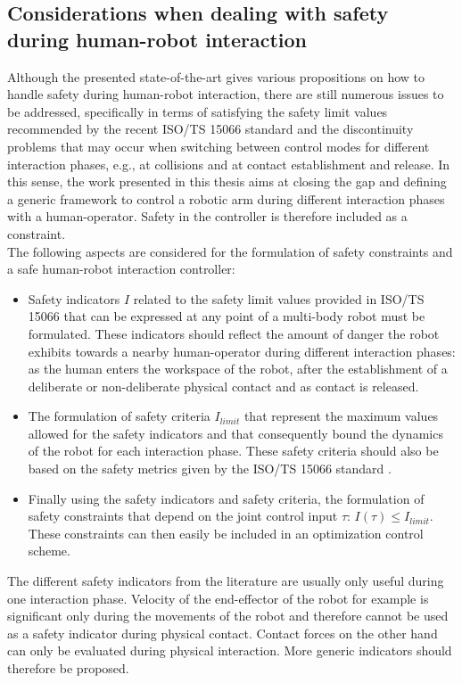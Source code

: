 \subsection{Considerations when dealing with safety during human-robot interaction}
Although the presented state-of-the-art gives various propositions on how to handle safety during human-robot interaction, there are still numerous issues to be addressed, specifically in terms of satisfying the safety limit values recommended by the recent ISO/TS 15066 standard \cite{ISO15066PDF} and the discontinuity problems that may occur when switching between control modes for different interaction phases, e.g., at collisions and at contact establishment and release. In this sense, the work presented in this thesis aims at closing the gap and defining a generic framework to control a robotic arm during different interaction phases with a human-operator. Safety in the controller is therefore included as a constraint.\\
The following aspects are considered for the formulation of safety constraints and a safe human-robot interaction controller: 
\begin{itemize}
\item Safety indicators $I$ related to the safety limit values provided in ISO/TS 15066 \cite{ISO15066PDF} that can be expressed at any point of a multi-body robot must be formulated. These indicators should reflect the amount of danger the robot exhibits towards a nearby human-operator during different interaction phases: as the human enters the workspace of the robot, after the establishment of a deliberate or non-deliberate physical contact and as contact is released.
\item The formulation of safety criteria $I_{limit}$ that represent the maximum values allowed for the safety indicators and that consequently bound the dynamics of the robot for each interaction phase. These safety criteria should also be based on the safety metrics given by the ISO/TS 15066 standard \cite{ISO15066PDF}.
\item  Finally using the safety indicators and safety criteria, the formulation of safety constraints that depend on the joint control input $\tau$:  $I(\tau) \leq I_{limit}$. These constraints can then easily be included in an optimization control scheme.
\end{itemize}
The different safety indicators from the literature are usually only useful during one interaction phase. Velocity of the end-effector of the robot for example is significant only during the movements of the robot and therefore cannot be used as a safety indicator during physical contact. Contact forces on the other hand can only be evaluated during physical interaction. More generic indicators should therefore be proposed. \\
